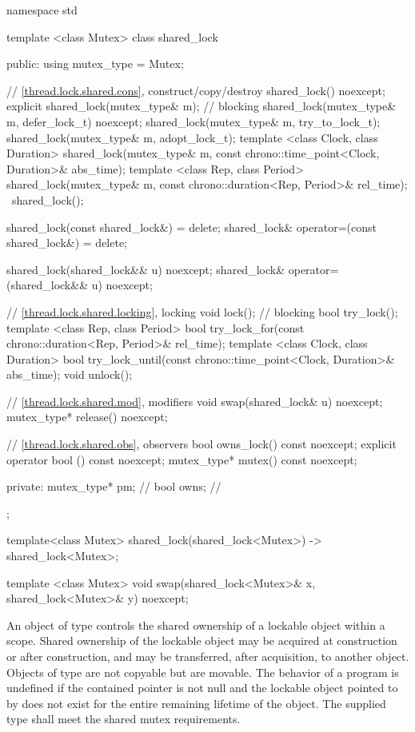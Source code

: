 %
\begin{codeblock}
namespace std {
  template <class Mutex>
  class shared_lock {
  public:
    using mutex_type = Mutex;

    // \ref{thread.lock.shared.cons}, construct/copy/destroy
    shared_lock() noexcept;
    explicit shared_lock(mutex_type& m);  // blocking
    shared_lock(mutex_type& m, defer_lock_t) noexcept;
    shared_lock(mutex_type& m, try_to_lock_t);
    shared_lock(mutex_type& m, adopt_lock_t);
    template <class Clock, class Duration>
      shared_lock(mutex_type& m,
                  const chrono::time_point<Clock, Duration>& abs_time);
    template <class Rep, class Period>
      shared_lock(mutex_type& m,
                const chrono::duration<Rep, Period>& rel_time);
    ~shared_lock();

    shared_lock(const shared_lock&) = delete;
    shared_lock& operator=(const shared_lock&) = delete;

    shared_lock(shared_lock&& u) noexcept;
    shared_lock& operator=(shared_lock&& u) noexcept;

    // \ref{thread.lock.shared.locking}, locking
    void lock();  // blocking
    bool try_lock();
    template <class Rep, class Period>
      bool try_lock_for(const chrono::duration<Rep, Period>& rel_time);
    template <class Clock, class Duration>
      bool try_lock_until(const chrono::time_point<Clock, Duration>& abs_time);
    void unlock();

    // \ref{thread.lock.shared.mod}, modifiers
    void swap(shared_lock& u) noexcept;
    mutex_type* release() noexcept;

    // \ref{thread.lock.shared.obs}, observers
    bool owns_lock() const noexcept;
    explicit operator bool () const noexcept;
    mutex_type* mutex() const noexcept;

  private:
    mutex_type* pm; // \expos
    bool owns;      // \expos
  };

  template<class Mutex> shared_lock(shared_lock<Mutex>) -> shared_lock<Mutex>;

  template <class Mutex>
    void swap(shared_lock<Mutex>& x, shared_lock<Mutex>& y) noexcept;
}
\end{codeblock}

\pnum
An object of type  controls the shared ownership of a
lockable object within a scope. Shared ownership of the lockable object may be
acquired at construction or after construction, and may be transferred, after
acquisition, to another  object. Objects of type
 are not copyable but are movable. The behavior of a program
is undefined if the contained pointer  is not null and the lockable
object pointed to by  does not exist for the entire remaining
lifetime of the  object. The supplied
 type shall meet the shared mutex
requirements.

